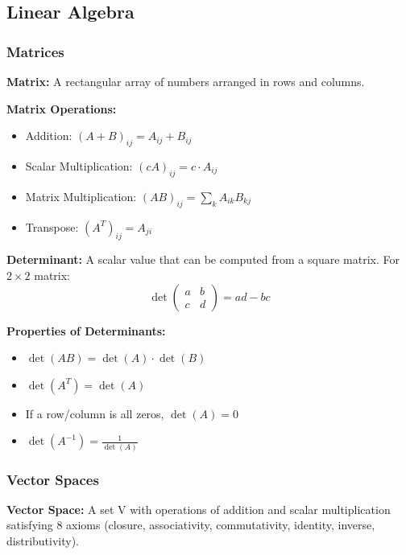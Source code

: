 \documentclass[11pt,a4paper]{article}
\begin{document}
\subsection{Linear Algebra}

\subsubsection{Matrices}

\begin{defbox}
\textbf{Matrix:} A rectangular array of numbers arranged in rows and columns.
\end{defbox}

\textbf{Matrix Operations:}
\begin{itemize}
    \item Addition: $(A + B)_{ij} = A_{ij} + B_{ij}$
    \item Scalar Multiplication: $(cA)_{ij} = c \cdot A_{ij}$
    \item Matrix Multiplication: $(AB)_{ij} = \sum_{k} A_{ik}B_{kj}$
    \item Transpose: $(A^T)_{ij} = A_{ji}$
\end{itemize}

\begin{defbox}
\textbf{Determinant:} A scalar value that can be computed from a square matrix. For $2 \times 2$ matrix:
\[
    \det\begin{pmatrix} a & b \\ c & d \end{pmatrix} = ad - bc
\]
\end{defbox}

\textbf{Properties of Determinants:}
\begin{itemize}
    \item $\det(AB) = \det(A) \cdot \det(B)$
    \item $\det(A^T) = \det(A)$
    \item If a row/column is all zeros, $\det(A) = 0$
    \item $\det(A^{-1}) = \frac{1}{\det(A)}$
\end{itemize}

\subsubsection{Vector Spaces}

\begin{defbox}
\textbf{Vector Space:} A set V with operations of addition and scalar multiplication satisfying 8 axioms (closure, associativity, commutativity, identity, inverse, distributivity).
\end{defbox}
\end{document}
